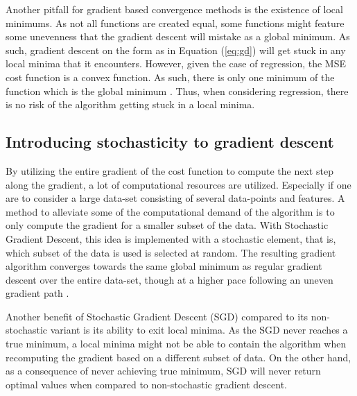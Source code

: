 \documentclass
[twocolumn,
secnumarabic,
nobibnotes,
aps,
prl,
reprint,
groupedaddress,
amsmath,
amssymb
]{revtex4-2}
\begin{document}
Another pitfall for gradient based convergence methods is the existence of local minimums. As not all functions are created equal, some functions might feature some unevenness that the gradient descent will mistake as a global minimum. As such, gradient descent on the form as in Equation (\ref{eq:gd}) will get stuck in any local minima that it encounters. However, given the case of regression, the MSE cost function is a convex function. As such, there is only one minimum of the function which is the global minimum \cite{Geron2019}. Thus, when considering regression, there is no risk of the algorithm getting stuck in a local minima.

\subsection{Introducing stochasticity to gradient descent}
By utilizing the entire gradient of the cost function to compute the next step along the gradient, a lot of computational resources are utilized. Especially if one are to consider a large data-set consisting of several data-points and features. A method to alleviate some of the computational demand of the algorithm is to only compute the gradient for a smaller subset of the data. With Stochastic Gradient Descent, this idea is implemented with a stochastic element, that is, which subset of the data is used is selected at random. The resulting gradient algorithm converges towards the same global minimum as regular gradient descent over the entire data-set, though at a higher pace following an uneven gradient path \cite{Geron2019}.

Another benefit of Stochastic Gradient Descent (SGD) compared to its non-stochastic variant is its ability to exit local minima. As the SGD never reaches a true minimum, a local minima might not be able to contain the algorithm when recomputing the gradient based on a different subset of data. On the other hand, as a consequence of never achieving true minimum, SGD will never return optimal values when compared to non-stochastic gradient descent.
\end{document}
